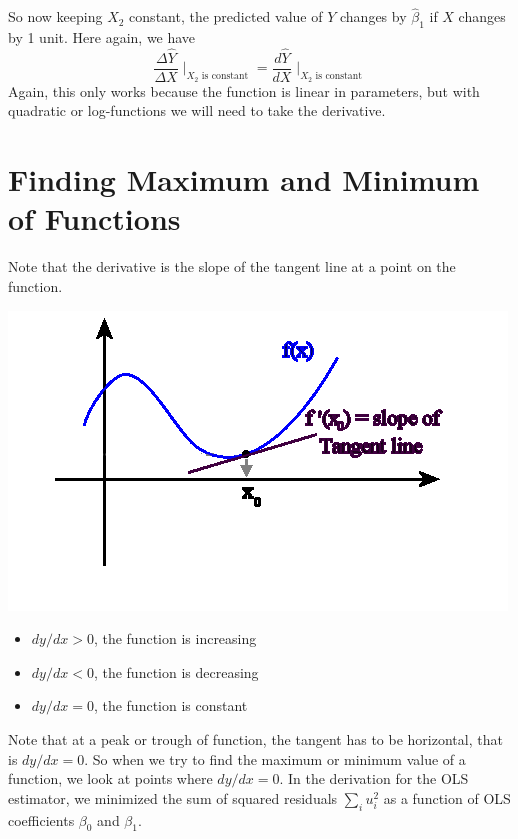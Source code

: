 \documentclass{./../../Latex/handout}
\begin{document}
So now keeping $X_2$ constant, the predicted value of $Y$ changes by $\hat{\beta}_1$ if $X$ changes by 1 unit. Here again, we have
$$\frac{\Delta \hat{Y}}{\Delta X} \mid_{X_2 \text{ is constant}} = \frac{d \hat{Y}}{d X} \mid_{X_2 \text{ is constant}} $$ 
Again, this only works because the function is linear in parameters, but with quadratic or log-functions we will need to take the derivative. 

\section{Finding Maximum and Minimum of Functions}

Note that the derivative is the slope of the tangent line at a point on the function. \\

\begin{minipage}{\textwidth}
\begin{minipage}{0.5\textwidth}
\includegraphics[scale=0.5]{tangent.gif}
\end{minipage}	
\begin{minipage}{0.5\textwidth}
\begin{itemize}
\item $dy/dx >0$, the function is increasing
\item $dy/dx<0$, the function is decreasing
\item $dy/dx=0$, the function is constant
\end{itemize}
\end{minipage}
\end{minipage}


Note that at a peak or trough of function, the tangent has to be horizontal, that is $dy/dx = 0$. So when we try to find the maximum or minimum value of a function, we look at points where $dy/dx=0$. In the derivation for the OLS estimator, we minimized the sum of squared residuals $\sum_i u_i^2$ as a function of OLS coefficients $\beta_0$ and $\beta_1$. 
\end{document}
